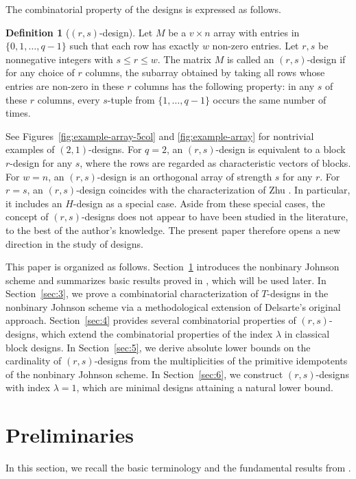 \documentclass[a4paper, 11pt]{article}
\theoremstyle{definition}
\newtheorem{definition}[theorem]{Definition}
\begin{document}
The combinatorial property of the designs is expressed as follows. 

\begin{definition}[$(r,s)$-design]\label{def:rs-design_1}
Let $M$ be a $v\times n$ array with entries in $\{0,1,\ldots,q-1\}$ such that each row has exactly 
$w$ non-zero entries.  
Let $r,s$ be nonnegative integers with $s\leq r\leq w$. 
The matrix $M$ is called an $(r,s)$-design if for any choice of $r$ columns, the subarray obtained by taking all rows whose entries are non-zero in these $r$ columns has the following property: 
in any $s$ of these $r$ columns, every $s$-tuple from $\{1,\ldots,q-1\}$ occurs the same number of times.
\end{definition}

See Figures~\ref{fig:example-array-5col} and \ref{fig:example-array} for nontrivial examples of 
$(2,1)$-designs. 
For $q=2$, an $(r,s)$-design is equivalent to a block $r$-design for any $s$, where the rows 
are regarded as characteristic vectors of blocks. 
For $w=n$, an $(r,s)$-design is an orthogonal array of strength $s$ for any $r$. 
For $r=s$, an $(r,s)$-design coincides with the characterization of Zhu \cite{Z21}. In particular, it includes an $H$-design \cite{Hanani63} as a special case. 
Aside from these special cases, the concept of $(r,s)$-designs does not appear to have been studied 
in the literature, to the best of the author's knowledge.  
The present paper therefore opens a new direction in the study of designs.


This paper is organized as follows. 
Section~\ref{sec:2} introduces the nonbinary Johnson scheme and summarizes basic results proved in \cite{TAG85}, which will be used later. 
In Section~\ref{sec:3}, we prove a combinatorial characterization of $T$-designs in the nonbinary Johnson scheme via a methodological extension of Delsarte's original approach. 
Section~\ref{sec:4} provides several combinatorial properties of $(r,s)$-designs, which extend the combinatorial properties of the index $\lambda$ in classical block designs. 
In Section~\ref{sec:5}, we derive absolute lower bounds on the cardinality of $(r,s)$-designs from the multiplicities of the primitive idempotents of the nonbinary Johnson scheme. 
In Section~\ref{sec:6}, we construct $(r,s)$-designs with index $\lambda=1$, which are minimal designs attaining a natural lower bound.







\section{Preliminaries} \label{sec:2}
In this section, we recall the basic terminology and the fundamental results from \cite{TAG85}. 
\end{document}
